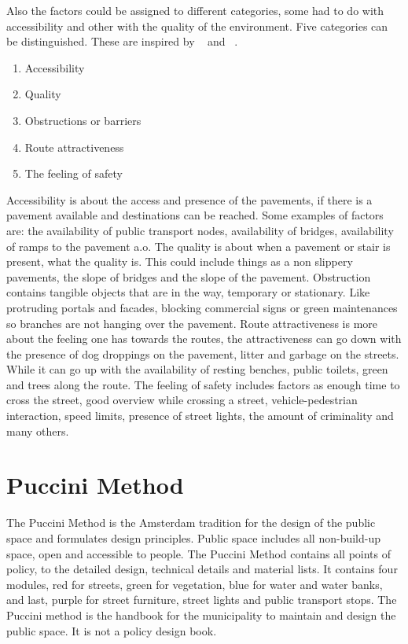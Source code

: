 Also the factors could be assigned to different categories, some had to do with accessibility and other with the quality of the environment. Five categories can be distinguished. These are inspired by ~\cite{Ballester} and ~\cite{Rosenberg2013}.

\begin{enumerate}

\item Accessibility
\item Quality 
\item Obstructions or barriers
\item Route attractiveness 
\item The feeling of safety
\end{enumerate}

Accessibility is about the access and presence of the pavements, if there is a pavement available and destinations can be reached. Some examples of factors are: the availability of public transport nodes,  availability of bridges, availability of ramps to the pavement a.o. 
The quality is about when a pavement or stair is present, what the quality is. This could include things as a non slippery pavements, the slope of bridges and the slope of the pavement. 
Obstruction contains tangible objects that are in the way, temporary or stationary.  Like protruding portals and facades, blocking commercial signs or green maintenances so branches are not hanging over the pavement.
Route attractiveness is more about the feeling one has towards the routes, the attractiveness can go down with the presence of dog droppings on the pavement, litter and garbage on the streets. While it can go up with the availability of resting benches, public toilets, green and trees along the route. 
The feeling of safety includes factors as enough time to cross the street, good overview while crossing a street, vehicle-pedestrian interaction, speed limits, presence of street lights, the amount of criminality and many others. 


\section{Puccini Method}\label{puccini}
The Puccini Method is the Amsterdam tradition for the design of the public space and formulates design principles. Public space includes all non-build-up space, open and accessible to people. The Puccini Method contains all points of policy, to the detailed design, technical details and material lists. It contains four modules, red for streets, green for vegetation, blue for water and water banks, and last, purple for street furniture, street lights and public transport stops. 
The Puccini method is the handbook for the municipality to maintain and design the public space. It is not a policy design book.~\cite{puccini2014}

